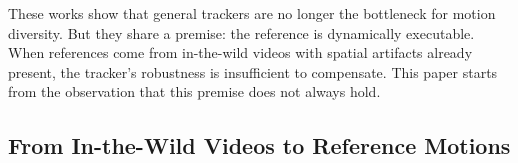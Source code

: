 \documentclass{article}
\begin{document}
	These works show that general trackers are no longer the bottleneck for motion diversity. But they share a premise: the reference is dynamically executable. When references come from in-the-wild videos with spatial artifacts already present, the tracker's robustness is insufficient to compensate. This paper starts from the observation that this premise does not always hold.

\subsection{From In-the-Wild Videos to Reference Motions}


	
	
	

	
	
\end{document}
